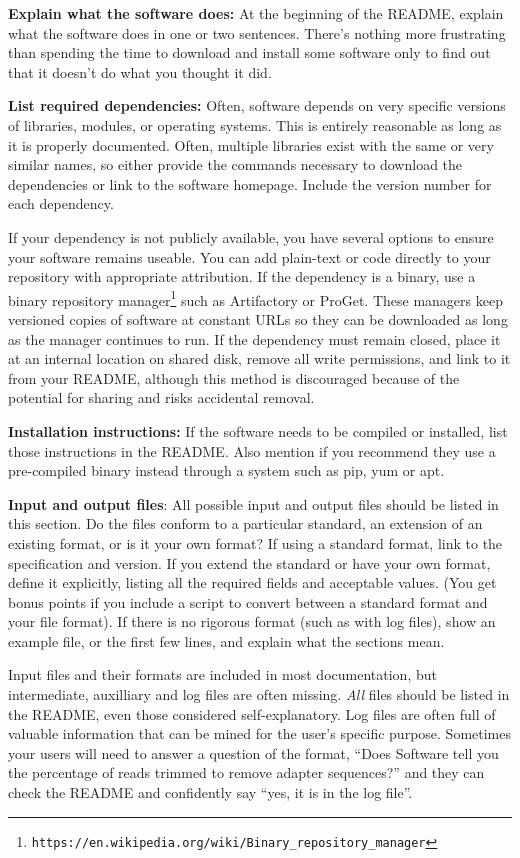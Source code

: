 \documentclass[10pt]{article}
\newcommand{\withurl}[2]{{#1}\footnote{\texttt{#2}}}
\begin{document}
\textbf{Explain what the software does:} At the beginning of the README,
explain what the software does in one or two sentences.
There's nothing more frustrating
than spending the time to download and install some software only to
find out that it doesn't do what you thought it did.

\textbf{List required dependencies:} Often, software depends on very
specific versions of libraries, modules, or operating systems. This is
entirely reasonable as long as it is properly documented. Often,
multiple libraries exist with the same or very similar names, so
either provide the commands necessary to download the dependencies or
link to the software homepage. Include the version number for each
dependency.  

If your dependency is not publicly available,
you have several options to ensure your software remains useable.
You can add plain-text or code directly to
your repository with appropriate attribution. If the dependency is a binary, use a
\withurl{binary repository manager}{https://en.wikipedia.org/wiki/Binary\_repository\_manager}
such as Artifactory or ProGet. These managers keep versioned copies of
software at constant URLs so they can be downloaded as long as the
manager continues to run. If the dependency must remain closed, place it at an
internal location on shared disk, remove all write permissions, and
link to it from your README, although this method is 
discouraged because of the potential for sharing and risks accidental removal.

\textbf{Installation instructions:} If the software needs to be compiled
or installed, list those instructions in the README. Also
mention if you recommend they use a pre-compiled binary instead
through a system such as pip, yum or apt.

\textbf{Input and output files}: All possible input and output files
should be listed in this section. Do the files conform to a particular
standard, an extension of an existing format, or is it your own
format? If using a standard format, link to the specification and
version. If you extend the standard or have your own format, define it
explicitly, listing all the required fields and acceptable values.
(You get bonus points if you include a script to convert between
a standard format and your file format). If there is no rigorous format
(such as with log files), show an example file, or the first few lines,
and explain what the sections mean.

Input files and their formats are included in most documentation, but
intermediate, auxilliary and log files are often missing. 
\emph{All} files should be listed in the README, even those considered self-explanatory. Log
files are often full of valuable information that can be
mined for the user's specific purpose. Sometimes your users will need to answer a question of
the format, ``Does Software tell you the percentage of reads trimmed to remove
adapter sequences?'' and they can check the README and confidently
say ``yes, it is in the log file''.
\end{document}
